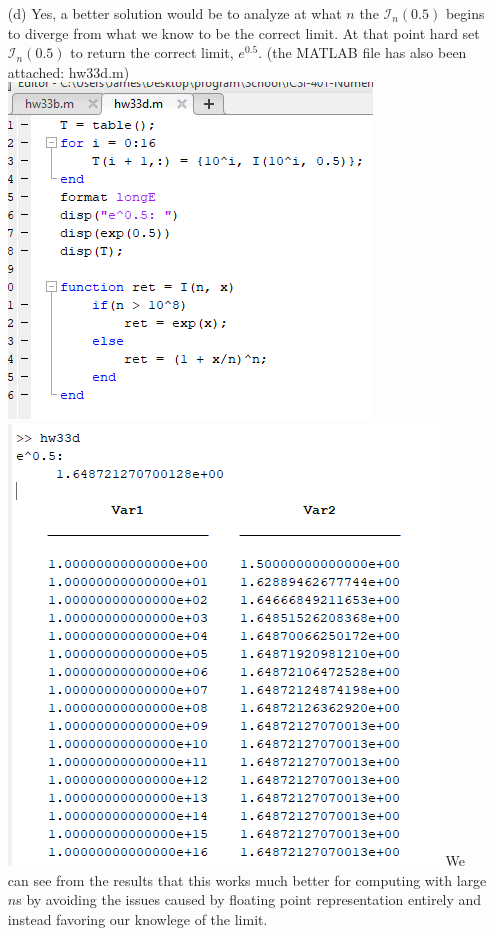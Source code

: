 \documentclass{article}
\begin{document}
\begin{itemize}
\begin{itemize}
        \newpage
        \item[(d)] Yes, a better solution would be to analyze at what $n$ the $\mathcal{I}_n(0.5)$ begins to diverge from what we know to be the correct limit. At that point hard set $\mathcal{I}_n(0.5)$ to return the correct limit, $e^{0.5}$. \newline\newline
        (the MATLAB file has also been attached: hw33d.m)
        \newline
        \includegraphics[scale=0.4]{Homework3/3.3d.png}
        \newline
        \includegraphics[scale=0.4]{Homework3/res3.3d.png}
        \newline
        We can see from the results that this works much better for computing with large $n$s by avoiding the issues caused by floating point representation entirely and instead favoring our knowlege of the limit. 
    \end{itemize}
\end{itemize}
\end{document}
